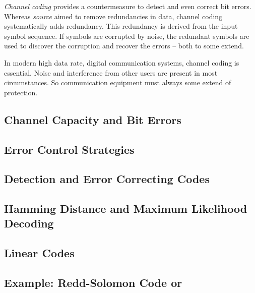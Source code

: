 \begin{refsection}
 \emph{Channel coding} provides a countermeasure to detect and even correct bit errors. Whereas \emph{source} aimed to remove redundancies in data, channel coding systematically adds redundancy. This redundancy is derived from the input symbol sequence. If symbols are corrupted by noise, the redundant symbols are used to discover the corruption and recover the errors -- both to some extend.

In modern high data rate, digital communication systems, channel coding is essential. Noise and interference from other users are present in most circumstances. So communication equipment must always some extend of protection.

\subsection{Channel Capacity and Bit Errors}

\subsection{Error Control Strategies}

\subsection{Detection and Error Correcting Codes}

\subsection{Hamming Distance and Maximum Likelihood Decoding}

\subsection{Linear Codes}

\subsection{Example: Redd-Solomon Code or }

{}
\printbibliography[heading=subbibliography]
\end{refsection}

